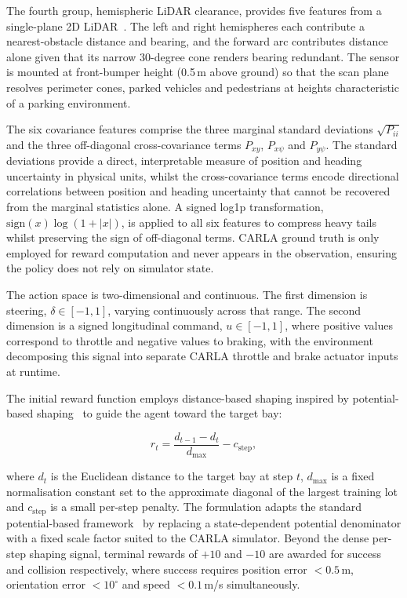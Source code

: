 \documentclass{sig-alternate}
\begin{document}
The fourth group, hemispheric LiDAR clearance, provides five features from a single-plane 2D LiDAR~\cite{sick2026tim571}. The left and right hemispheres each contribute a nearest-obstacle distance and bearing, and the forward arc contributes distance alone given that its narrow 30-degree cone renders bearing redundant. The sensor is mounted at front-bumper height (0.5\,m above ground) so that the scan plane resolves perimeter cones, parked vehicles and pedestrians at heights characteristic of a parking environment.

The six covariance features comprise the three marginal standard deviations $\sqrt{P_{ii}}$ and the three off-diagonal cross-covariance terms $P_{xy}$, $P_{x\psi}$ and $P_{y\psi}$. The standard deviations provide a direct, interpretable measure of position and heading uncertainty in physical units, whilst the cross-covariance terms encode directional correlations between position and heading uncertainty that cannot be recovered from the marginal statistics alone. A signed log1p transformation, $\mathrm{sign}(x)\log(1+|x|)$, is applied to all six features to compress heavy tails whilst preserving the sign of off-diagonal terms. CARLA ground truth is only employed for reward computation and never appears in the observation, ensuring the policy does not rely on simulator state.

The action space is two-dimensional and continuous. The first dimension is steering, $\delta \in [-1, 1]$, varying continuously across that range. The second dimension is a signed longitudinal command, $u \in [-1, 1]$, where positive values correspond to throttle and negative values to braking, with the environment decomposing this signal into separate CARLA throttle and brake actuator inputs at runtime. 

The initial reward function employs distance-based shaping inspired by potential-based shaping~\cite{ng1999reward} to guide the agent toward the target bay:

\begin{equation}
    r_t = \frac{d_{t-1} - d_t}{d_{\max}} - c_{\text{step}},
    \label{eq:reward}
\end{equation}

\noindent where $d_t$ is the Euclidean distance to the target bay at step $t$, $d_{\max}$ is a fixed normalisation constant set to the approximate diagonal of the largest training lot and $c_{\text{step}}$ is a small per-step penalty. The formulation adapts the standard potential-based framework~\cite{ng1999reward} by replacing a state-dependent potential denominator with a fixed scale factor suited to the CARLA simulator. Beyond the dense per-step shaping signal, terminal rewards of $+10$ and $-10$ are awarded for success and collision respectively, where success requires position error $< 0.5$\,m, orientation error $< 10^\circ$ and speed $< 0.1$\,m/s simultaneously. 
\end{document}
